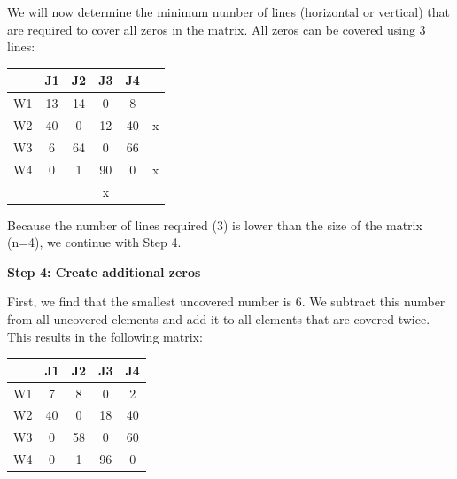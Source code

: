 \documentclass{llncs}
\begin{document}
We will now determine the minimum number of lines (horizontal or vertical) that are required to cover all zeros in the matrix. All zeros can be covered using 3 lines:
\begin{table}[H]
  \centering
    \begin{tabular}{cccccc}
    \toprule
          & J1    & J2    & J3    & J4    &  \\
    \midrule
    \phantom{2333} W1 \phantom{2333}   & \phantom{2333} 13 \phantom{2333}   & \phantom{2333} 14 \phantom{2333}   & \cellcolor[rgb]{ 0,  .69,  .941} \phantom{2333} 0 \phantom{2333} & \phantom{2333} 8 \phantom{2333}    & \phantom{2333} \phantom{x} \phantom{2333} \\
    W2    & \cellcolor[rgb]{ 0,  .69,  .941}40 & \cellcolor[rgb]{ 0,  .69,  .941}0 & \cellcolor[rgb]{ 0,  .69,  .941}12 & \cellcolor[rgb]{ 0,  .69,  .941}40 & x \\
    W3    & 6     & 64    & \cellcolor[rgb]{ 0,  .69,  .941}0 & 66    &  \\
    W4    & \cellcolor[rgb]{ 0,  .69,  .941}0 & \cellcolor[rgb]{ 0,  .69,  .941}1 & \cellcolor[rgb]{ 0,  .69,  .941}90 & \cellcolor[rgb]{ 0,  .69,  .941}0 & x \\
          &       &       & x     &       &  \\
    \bottomrule
    \end{tabular}%
\end{table}%

Because the number of lines required (3) is lower than the size of the matrix (n=4), we continue with Step 4.

\textbf{Step 4: Create additional zeros}

First, we find that the smallest uncovered number is 6. We subtract this number from all uncovered elements and add it to all elements that are covered twice. This results in the following matrix:
\begin{table}[H]
  \centering
    \begin{tabular}{ccccc}
    \toprule
          & J1    & J2    & J3    & J4 \\
    \midrule
    \phantom{2333} W1 \phantom{2333}   & \phantom{2333} 7 \phantom{2333}    & \phantom{2333} 8 \phantom{2333}    & \phantom{2333} 0 \phantom{2333}    & \phantom{2333} 2 \phantom{2333}\\
    W2    & 40    & 0     & 18    & 40 \\
    W3    & 0     & 58    & 0     & 60 \\
    W4    & 0  & 1     & 96    & 0 \\
    \bottomrule
    \end{tabular}%
\end{table}%
\end{document}
